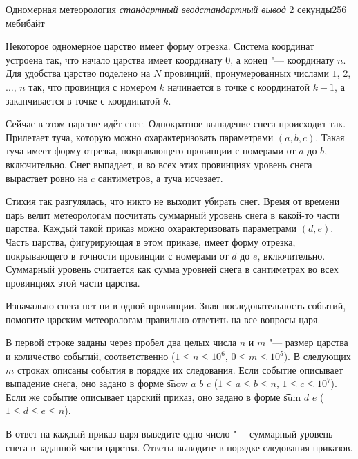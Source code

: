 \begin{problem}{Одномерная метеорология}
{\textsl{стандартный ввод}}{\textsl{стандартный вывод}}
{2 секунды}{256 мебибайт}{}

Некоторое одномерное царство имеет форму отрезка.
Система координат устроена так, что начало царства имеет координату $0$,
а конец "--- координату $n$.
Для удобства царство поделено на $N$ провинций, пронумерованных числами
$1$, $2$, $\ldots$, $n$ так, что провинция с номером $k$ начинается
в точке с координатой $k - 1$, а заканчивается в точке с координатой $k$.

Сейчас в этом царстве идёт снег. Однократное выпадение снега происходит так.
Прилетает туча, которую можно охарактеризовать параметрами $(a, b, c)$.
Такая туча имеет форму отрезка, покрывающего провинции
с номерами от $a$ до $b$, включительно.
Снег выпадает, и во всех этих провинциях уровень снега вырастает
ровно на $c$ сантиметров, а туча исчезает.

Стихия так разгулялась, что никто не выходит убирать снег.
Время от времени царь велит метеорологам посчитать суммарный уровень снега
в какой-то части царства.
Каждый такой приказ можно охарактеризовать параметрами $(d, e)$.
Часть царства, фигурирующая в этом приказе, имеет форму отрезка,
покрывающего в точности провинции с номерами от $d$ до $e$, включительно.
Суммарный уровень считается как сумма уровней снега в сантиметрах во всех
провинциях этой части царства.

Изначально снега нет ни в одной провинции.
Зная последовательность событий, помогите царским метеорологам правильно
ответить на все вопросы царя.

\InputFile

В первой строке заданы через пробел два целых числа $n$ и $m$ "--- размер
царства и количество событий, соответственно
($1 \le n \le 10^6$, $0 \le m \le 10^5$).
В следующих $m$ строках описаны события в порядке их следования.
Если событие описывает выпадение снега, оно задано в форме
\t{snow $a$ $b$ $c$} ($1 \le a \le b \le n$, $1 \le c \le 10^7$).
Если же событие описывает царский приказ, оно задано в форме
\t{sum $d$ $e$} ($1 \le d \le e \le n$).

\OutputFile

В ответ на каждый приказ царя выведите одно число "--- суммарный уровень
снега в заданной части царства.
Ответы выводите в порядке следования приказов.

\Examples

\begin{example}
%
%
\end{example}

\end{problem}
